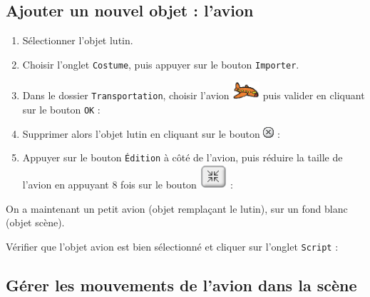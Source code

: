 \subsection{Ajouter un nouvel objet : l'avion}

\begin{enumerate}
\item Sélectionner l'objet lutin.
\item Choisir l'onglet \texttt{Costume}, puis appuyer sur le bouton \texttt{Importer}.
\item Dans le dossier \texttt{Transportation}, choisir l'avion \includegraphics[width=1cm]{./images/scratch/Avion} puis valider en cliquant sur le bouton \texttt{OK} :
\item Supprimer alors l'objet lutin en cliquant sur le bouton \includegraphics[width=.7cm]{./images/scratch/Supprimer} :
\item Appuyer sur le bouton \texttt{Édition} à côté de l'avion, puis réduire la taille de l'avion en appuyant 8 fois sur le bouton \includegraphics[width=1cm]{./images/scratch/Reduire} :
\end{enumerate}
On a maintenant un petit avion (objet remplaçant le lutin), sur un fond blanc (objet scène).

Vérifier que l'objet avion est bien sélectionné et cliquer sur l'onglet \texttt{Script} :







\subsection{Gérer les mouvements de l'avion dans la scène}  


